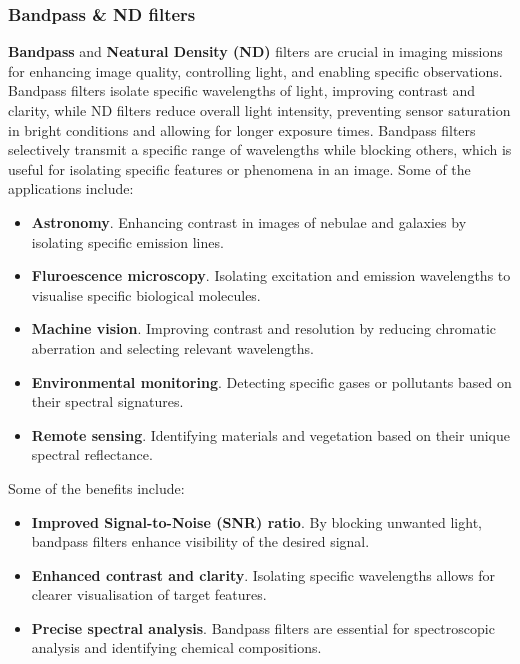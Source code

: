\subsubsection{Bandpass \& ND filters}
\textbf{Bandpass} and \textbf{Neatural Density (ND)} filters are crucial in imaging missions for enhancing image quality, controlling light, and enabling specific observations. Bandpass filters isolate specific wavelengths of light, improving contrast and clarity, while ND filters reduce overall light intensity, preventing sensor saturation in bright conditions and allowing for longer exposure times.
\nl
Bandpass filters selectively transmit a specific range of wavelengths while blocking others, which is useful for isolating specific features or phenomena in an image. Some of the applications include:
\begin{itemize}
    \item \textbf{Astronomy}. Enhancing contrast in images of nebulae and galaxies by isolating specific emission lines.
    \item \textbf{Fluroescence microscopy}. Isolating excitation and emission wavelengths to visualise specific biological molecules.
    \item \textbf{Machine vision}. Improving contrast and resolution by reducing chromatic aberration and selecting relevant wavelengths.
    \item \textbf{Environmental monitoring}. Detecting specific gases or pollutants based on their spectral signatures.
    \item \textbf{Remote sensing}. Identifying materials and vegetation based on their unique spectral reflectance.
\end{itemize}
Some of the benefits include:
\begin{itemize}
    \item \textbf{Improved Signal-to-Noise (SNR) ratio}. By blocking unwanted light, bandpass filters enhance visibility of the desired signal.
    \item \textbf{Enhanced contrast and clarity}. Isolating specific wavelengths allows for clearer visualisation of target features.
    \item \textbf{Precise spectral analysis}. Bandpass filters are essential for spectroscopic analysis and identifying chemical compositions.
\end{itemize}

